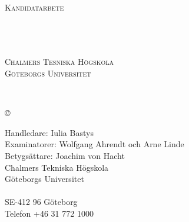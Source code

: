 \newpage
\thispagestyle{empty}
\begin{center}

    \textsc{\large Kandidatarbete \the\year }\\[4cm]

    \textbf{\Large \ambaTitle} \\[1cm]

    {\linespread{1.2}\large
    \StrSubstitute{\ambaAuthors}{,}{\\}
    \\ %
    }

    \vfill

    \ambaDepartmentSwedish \\
    \textsc{Chalmers Tesniska Högskola} \\
    \textsc{Göteborgs Universitet} \\
    \ambaCityCountryYearSwedish
\end{center}


\newpage
{\ambaTitle}\\
\textsc{\ambaAuthors}
\setlength{\parskip}{0.5cm}

\copyright{~\textsc{\ambaAuthors \the\year}}
\setlength{\parskip}{1cm}

Handledare: Iulia Bastys \\
Examinatorer: Wolfgang Ahrendt och Arne Linde \\
Betygsättare: Joachim von Hacht \\[1cm]

Chalmers Tekniska Högskola\\
Göteborgs Universitet\\
\ambaDepartmentSwedish \\
SE-412 96 Göteborg\\
Telefon +46 31 772 1000 \setlength{\parskip}{0.5cm}

\vfill
\ambaCityCountryYearSwedish
